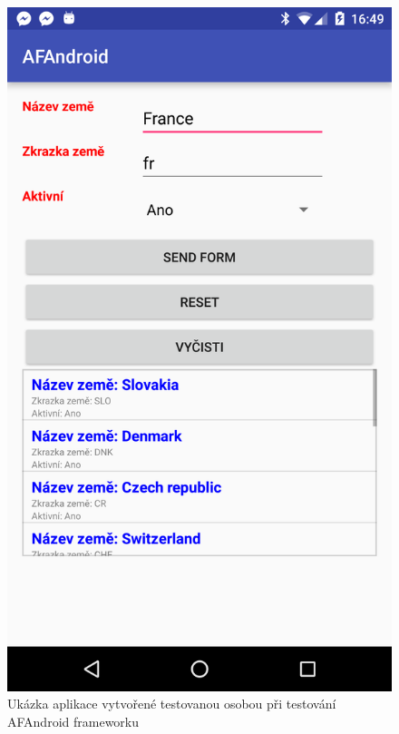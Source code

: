 \begin{figure}
\begin{center}
\includegraphics[width=\linewidth, height=\textheight, keepaspectratio]{figures/screenshots/testApp}
\caption{Ukázka aplikace vytvořené testovanou osobou při testování AFAndroid frameworku}
\label{img:testApp}
\end{center}
\end{figure}	